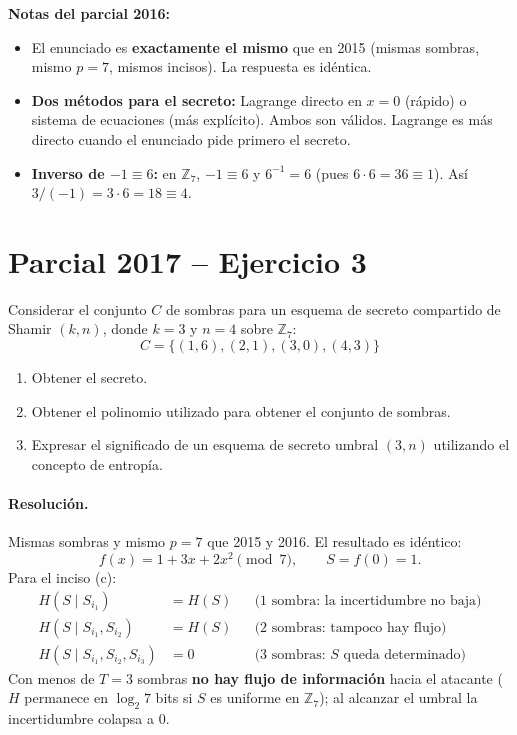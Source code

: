 \documentclass[11pt,a4paper]{article}
\begin{document}
\begin{tipsbox}
\textbf{Notas del parcial 2016:}
\begin{itemize}
  \item El enunciado es \textbf{exactamente el mismo} que en 2015 (mismas sombras, mismo $p=7$, mismos incisos). La respuesta es idéntica.
  \item \textbf{Dos métodos para el secreto:} Lagrange directo en $x=0$ (rápido) o sistema de ecuaciones (más explícito). Ambos son válidos. Lagrange es más directo cuando el enunciado pide primero el secreto.
  \item \textbf{Inverso de $-1 \equiv 6$:} en $\mathbb{Z}_7$, $-1 \equiv 6$ y $6^{-1} = 6$ (pues $6\cdot 6=36\equiv 1$). Así $3/(-1) = 3\cdot 6 = 18 \equiv 4$.
\end{itemize}
\end{tipsbox}

\section{Parcial 2017 -- Ejercicio 3}
\label{sec:2017}

\begin{consignabox}
Considerar el conjunto $C$ de sombras para un esquema de secreto compartido de Shamir $(k,n)$, donde $k=3$ y $n=4$ sobre $\mathbb{Z}_7$:
\[
  C = \{(1,6),(2,1),(3,0),(4,3)\}
\]
\begin{enumerate}[label=\alph*)]
  \item Obtener el secreto.
  \item Obtener el polinomio utilizado para obtener el conjunto de sombras.
  \item Expresar el significado de un esquema de secreto umbral $(3,n)$ utilizando el concepto de entropía.
\end{enumerate}
\end{consignabox}

\paragraph{Resolución.}
Mismas sombras y mismo $p=7$ que 2015 y 2016. El resultado es idéntico:
\[
  \boxed{f(x) = 1 + 3x + 2x^2 \pmod 7}, \qquad S = f(0) = \boxed{1}.
\]
Para el inciso (c):
\begin{align*}
  H(S \mid S_{i_1}) &= H(S) & &\text{(1 sombra: la incertidumbre no baja)}\\
  H(S \mid S_{i_1}, S_{i_2}) &= H(S) & &\text{(2 sombras: tampoco hay flujo)}\\
  H(S \mid S_{i_1}, S_{i_2}, S_{i_3}) &= 0 & &\text{(3 sombras: $S$ queda determinado)}
\end{align*}
Con menos de $T=3$ sombras \textbf{no hay flujo de información} hacia el atacante ($H$ permanece en $\log_2 7$ bits si $S$ es uniforme en $\mathbb{Z}_7$); al alcanzar el umbral la incertidumbre colapsa a 0.
\end{document}
